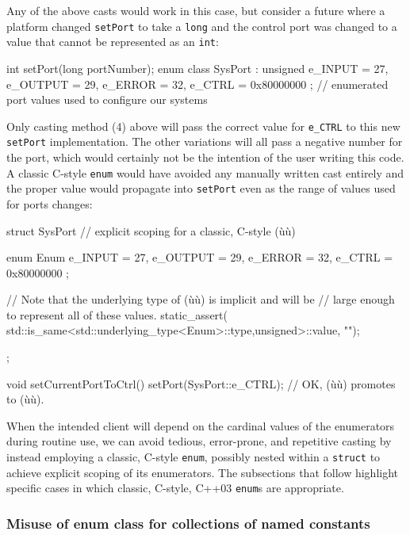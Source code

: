 \noindent Any of the above casts would work in this case, but consider a future
where a platform changed \texttt{setPort} to take a \texttt{long} and
the control port was changed to a value that cannot be represented as an
\texttt{int}:

\begin{emcppslisting}
int setPort(long portNumber);
enum class SysPort : unsigned { e_INPUT = 27, e_OUTPUT = 29, e_ERROR = 32,
                                e_CTRL = 0x80000000 };
    // enumerated port values used to configure our systems
\end{emcppslisting}

\noindent Only casting method (4) above will pass the correct value for
\texttt{e\_CTRL} to this new \texttt{setPort} implementation. The other
variations will all pass a negative number for the port, which would
certainly not be the intention of the user writing this code. A classic
C-style \texttt{enum} would have avoided any manually written cast
entirely and the proper value would propagate into \texttt{setPort} even
as the range of values used for ports changes:

\begin{emcppslisting}
struct SysPort  // explicit scoping for a classic, C-style (ù{}ù)
{
    enum Enum { e_INPUT = 27, e_OUTPUT = 29, e_ERROR = 32,
                e_CTRL = 0x80000000 };

    // Note that the underlying type of (ù{}ù) is implicit and will be
    // large enough to represent all of these values.
    static_assert(
        std::is_same<std::underlying_type<Enum>::type,unsigned>::value, "");
};

void setCurrentPortToCtrl()
{
    setPort(SysPort::e_CTRL);  // OK, (ù{}ù) promotes to (ù{}ù).
}
\end{emcppslisting}

\noindent When the intended client will depend on the cardinal values of the
enumerators during routine use, we can avoid tedious, error-prone, and
repetitive casting by instead employing a classic, C-style
\texttt{enum}, possibly nested within a \texttt{struct} to achieve
explicit scoping of its enumerators. The subsections that follow
highlight specific cases in which classic, C-style, C++03
\texttt{enum}s are appropriate.

\subsubsection[Misuse of {\tt enum} {\tt class} for collections of named constants]{Misuse of {\SubsubsecCode enum} {\SubsubsecCode class} for collections of named constants}\label{misuse-of-enum-class-for-collections-of-named-constants}

